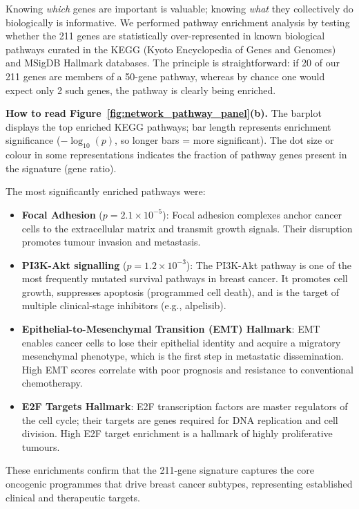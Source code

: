 \documentclass[10pt,a4paper,twocolumn]{article}
\begin{document}
Knowing \textit{which} genes are important is valuable; knowing \textit{what} they collectively do biologically is informative. We performed pathway enrichment analysis by testing whether the 211 genes are statistically over-represented in known biological pathways curated in the KEGG (Kyoto Encyclopedia of Genes and Genomes) and MSigDB Hallmark databases. The principle is straightforward: if 20 of our 211 genes are members of a 50-gene pathway, whereas by chance one would expect only 2 such genes, the pathway is clearly being enriched.

\textbf{How to read Figure~\ref{fig:network_pathway_panel}(b).} The barplot displays the top enriched KEGG pathways; bar length represents enrichment significance ($-\log_{10}(p)$, so longer bars = more significant). The dot size or colour in some representations indicates the fraction of pathway genes present in the signature (gene ratio).

The most significantly enriched pathways were:
\begin{itemize}
    \item \textbf{Focal Adhesion} ($p = 2.1 \times 10^{-5}$): Focal adhesion complexes anchor cancer cells to the extracellular matrix and transmit growth signals. Their disruption promotes tumour invasion and metastasis.
    \item \textbf{PI3K-Akt signalling} ($p = 1.2 \times 10^{-3}$): The PI3K-Akt pathway is one of the most frequently mutated survival pathways in breast cancer. It promotes cell growth, suppresses apoptosis (programmed cell death), and is the target of multiple clinical-stage inhibitors (e.g., alpelisib).
    \item \textbf{Epithelial-to-Mesenchymal Transition (EMT) Hallmark}: EMT enables cancer cells to lose their epithelial identity and acquire a migratory mesenchymal phenotype, which is the first step in metastatic dissemination. High EMT scores correlate with poor prognosis and resistance to conventional chemotherapy.
    \item \textbf{E2F Targets Hallmark}: E2F transcription factors are master regulators of the cell cycle; their targets are genes required for DNA replication and cell division. High E2F target enrichment is a hallmark of highly proliferative tumours.
\end{itemize}

These enrichments confirm that the 211-gene signature captures the core oncogenic programmes that drive breast cancer subtypes, representing established clinical and therapeutic targets.
\end{document}
